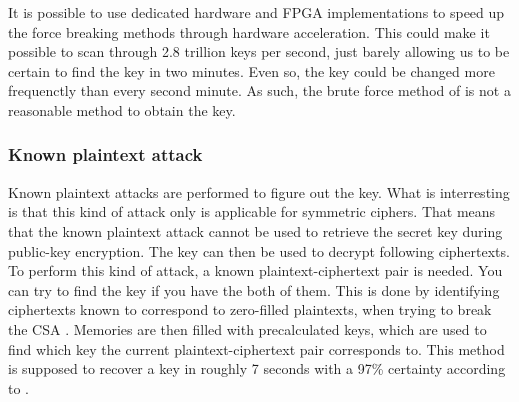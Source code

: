 It is possible to use dedicated hardware and FPGA implementations to 
speed up the force breaking methods through hardware acceleration. This 
could make it possible to scan through 2.8 trillion keys per second, 
just barely allowing us to be certain to find the key in two minutes. 
Even so, the key could be changed more frequenctly than every second 
minute. As such, the brute force method of is not a reasonable method 
to obtain the key. 

\subsubsection{Known plaintext attack}\label{sec:kpa}
Known plaintext attacks are performed to figure out the key. What is 
interresting is that this kind of attack only is applicable for 
symmetric ciphers. That means that the known plaintext attack cannot 
be used to retrieve the secret key during public-key encryption. The 
key can then be used to decrypt following ciphertexts. To perform this 
kind of attack, a known plaintext-ciphertext pair is needed. You can 
try to find the key if you have the both of them. This is done by 
identifying ciphertexts known to correspond to zero-filled plaintexts, 
when trying to break the CSA \citep{Breaking:2012}. Memories are then 
filled with precalculated keys, which are used to find which key the 
current plaintext-ciphertext pair corresponds to. This method is 
supposed to recover a key in roughly 7 seconds with a 97\% certainty 
according to \citet{Breaking:2012}.
